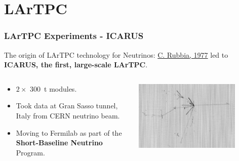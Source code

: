 \section {LArTPC}


\begin{frame}
  \frametitle{LArTPC Experiments - ICARUS}

  The origin of LArTPC technology for Neutrinos: \href{http://cds.cern.ch/record/117852/files/CERN-EP-INT-77-8.pdf}{C. Rubbia, 1977} led to \textbf{ICARUS, the first, large-scale LArTPC}.

  \begin{columns}
    \begin{column}{0.5\textwidth}
      \begin{itemize}
      \item $2\times$ \SI{300}{\tonne} modules.
      \item Took data at Gran Sasso tunnel, Italy from CERN neutrino beam.
      \item Moving to Fermilab as part of the \textbf{Short-Baseline
        Neutrino} Program.
      \end{itemize}
    \end{column}
    \begin{column}{0.5\textwidth}
      \includegraphics[width=0.8\textwidth]{icarus.png}
    \end{column}
  \end{columns}
\end{frame}

